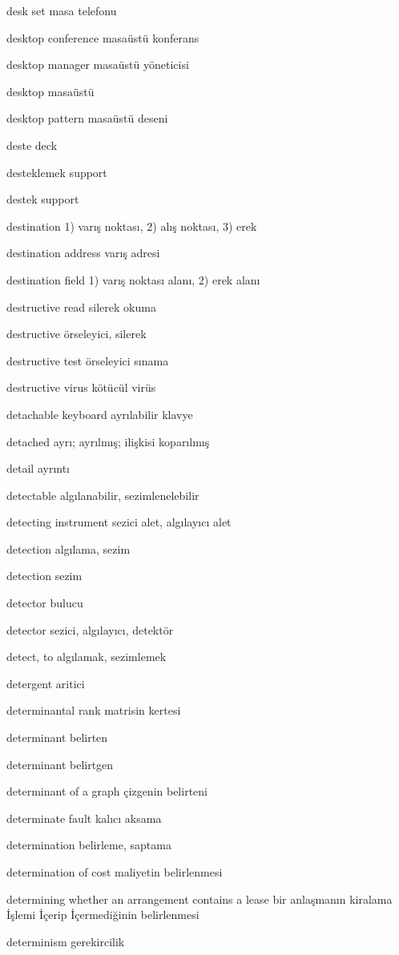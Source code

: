 \documentclass[12pt,fleqn]{article}\usepackage{../../common}
\begin{document}
desk set masa telefonu

desktop conference masaüstü konferans

desktop manager masaüstü yöneticisi

desktop masaüstü

desktop pattern masaüstü deseni

deste deck

desteklemek support

destek support

destination 1) varış noktası, 2) alış noktası, 3) erek

destination address varış adresi

destination field 1) varış noktası alanı, 2) erek alanı

destructive read silerek okuma

destructive örseleyici, silerek

destructive test örseleyici sınama

destructive virus kötücül virüs

detachable keyboard ayrılabilir klavye

detached ayrı; ayrılmış; ilişkisi koparılmış

detail ayrıntı

detectable algılanabilir, sezimlenelebilir

detecting instrument sezici alet, algılayıcı alet

detection algılama, sezim

detection sezim

detector bulucu

detector sezici, algılayıcı, detektör

detect, to algılamak, sezimlemek

detergent aritici

determinantal rank matrisin kertesi

determinant belirten

determinant belirtgen

determinant of a graph çizgenin belirteni

determinate fault kalıcı aksama

determination belirleme, saptama

determination of cost maliyetin belirlenmesi

determining whether an arrangement contains a lease bir anlaşmanın kiralama İşlemi İçerip İçermediğinin belirlenmesi

determinism gerekircilik
\end{document}
